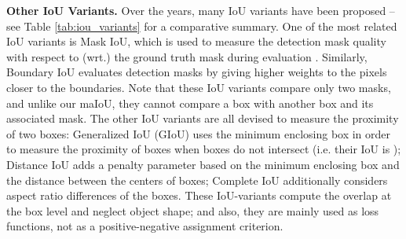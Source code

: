 \documentclass{bmvc2k}
\begin{document}
\noindent \textbf{Other IoU Variants.} Over the years, many IoU variants have been proposed -- see Table \ref{tab:iou_variants} for a comparative summary. One of the most related IoU variants is Mask IoU, which is used to measure the detection mask quality with respect to (wrt.) the ground truth mask during evaluation \cite{COCO,Cityscapes}. Similarly, Boundary IoU \cite{boundaryiou} evaluates detection masks by giving higher weights to  the pixels closer to the boundaries. Note that these IoU variants compare only two masks, and unlike our maIoU, they cannot compare a box  with another box and its associated mask. The other IoU variants are all devised to measure the proximity of two boxes: Generalized IoU (GIoU) \cite{GIoULoss} uses the minimum enclosing box in order to measure the proximity of boxes when boxes do not intersect (i.e. their IoU is ); Distance IoU \cite{DIoULoss} adds a penalty parameter based on the minimum enclosing box and the distance between the centers of boxes; Complete IoU \cite{CIoULoss} additionally considers aspect ratio differences of the boxes. These IoU-variants compute the overlap at the box level and neglect object shape; and also, they are mainly used as loss functions, not as a positive-negative assignment criterion.
\begin{comment}
\begin{table}[h!]
    \centering
    \begin{tabular}{|c|c|c|}
         \hline
         \textbf{Method} & \textbf{G.T.} & \textbf{Anchor} \\ \hline
         Mask IoU \cite{COCO, Cityscapes} & Mask & Mask \\ 
         Bounded IoU \cite{boundaryiou} & Mask & Mask \\ \hline
         GIoU \cite{GIoULoss} & Box & Box \\ 
         DIoU \cite{DIoULoss} & Box & Box \\ 
         CIoU \cite{DIoULoss} & Box & Box \\ \hline
         maIoU (This Work) & Box + Mask & Box \\ \hline
    \end{tabular}
    \caption{Summary of IoU variants considering their annotation types for both ground-truth (G.T.) and anchor boxes. The only method that uses both mask and box annotations is maIoU.}
    \label{tab:iou_variants}
\end{table}
\end{comment}
\end{document}
